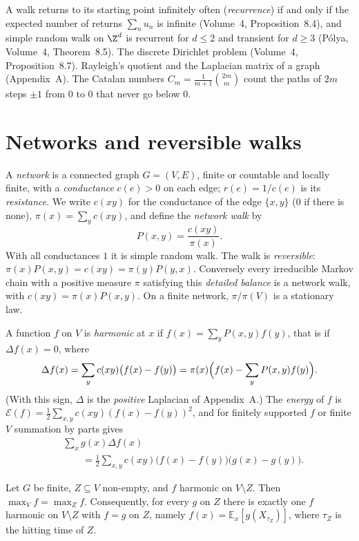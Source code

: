 \begin{reminder}
A walk returns to its starting point infinitely often (\emph{recurrence}) if and only if the expected number of returns $\sum_nu_n$ is infinite (Volume~4, Proposition~8.4), and simple random walk on $\Z^d$ is recurrent for
$d\le2$ and transient for $d\ge3$ (P\'olya, Volume~4, Theorem~8.5). The discrete Dirichlet problem (Volume~4, Proposition~8.7). Rayleigh's quotient and the Laplacian matrix of a graph (Appendix~A). The Catalan numbers
$C_m=\frac1{m+1}\binom{2m}m$ count the paths of $2m$ steps $\pm1$ from $0$ to $0$ that never go below $0$.
\end{reminder}

\section{Networks and reversible walks}

A \emph{network} is a connected graph $G=(V,E)$, finite or countable and locally finite, with a \emph{conductance} $c(e)>0$ on each edge; $r(e)=1/c(e)$ is its \emph{resistance}. We write $c(xy)$ for the conductance of the edge
$\{x,y\}$ ($0$ if there is none), $\pi(x)=\sum_yc(xy)$, and define the \emph{network walk} by
\[
P(x,y)=\frac{c(xy)}{\pi(x)} .
\]
With all conductances $1$ it is simple random walk. The walk is \emph{reversible}: $\pi(x)P(x,y)=c(xy)=\pi(y)P(y,x)$. Conversely every irreducible Markov chain with a positive measure $\pi$ satisfying this
\emph{detailed balance} is a network walk, with $c(xy)=\pi(x)P(x,y)$. On a finite network, $\pi/\pi(V)$ is a stationary law.

A function $f$ on $V$ is \emph{harmonic} at $x$ if $f(x)=\sum_yP(x,y)f(y)$, that is if $\Delta f(x)=0$, where
\[
\Delta f(x)=\sum_yc(xy)\bigl(f(x)-f(y)\bigr)=\pi(x)\Bigl(f(x)-\sum_yP(x,y)f(y)\Bigr).
\]
(With this sign, $\Delta$ is the \emph{positive} Laplacian of Appendix~A.) The \emph{energy} of $f$ is $\mathcal E(f)=\frac12\sum_{x,y}c(xy)(f(x)-f(y))^2$, and for finitely supported $f$ or finite $V$ summation by parts gives
\begin{equation}\label{eq:green}
\begin{aligned}
&\sum_xg(x)\Delta f(x)\\
&\qquad=\frac12\sum_{x,y}c(xy)\bigl(f(x)-f(y)\bigr)\bigl(g(x)-g(y)\bigr).
\end{aligned}
\end{equation}

\begin{lemma}\label{lem:maxprinciple}
Let $G$ be finite, $Z\subseteq V$ non-empty, and $f$ harmonic on $V\setminus Z$. Then $\max_Vf=\max_Zf$. Consequently, for every $g$ on $Z$ there is exactly one $f$ harmonic on $V\setminus Z$ with $f=g$ on $Z$, namely
$f(x)=\mathbb E_x[g(X_{\tau_Z})]$, where $\tau_Z$ is the hitting time of $Z$.
\end{lemma}


